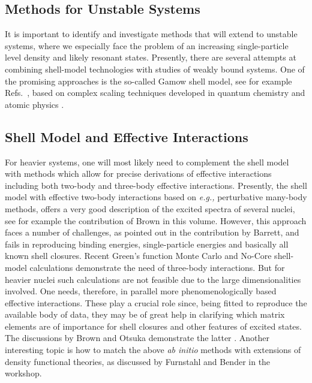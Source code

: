 \documentclass[12pt]{iopart}
\begin{document}
\subsection{Methods for Unstable Systems} 

It is important to identify and investigate 
methods that will extend to unstable 
systems, where we especially face the problem of an increasing single-particle 
level density and likely resonant states.
Presently, there are several attempts at  
combining shell-model 
technologies with  studies of weakly bound systems. 
One of the promising approaches is 
the so-called Gamow shell model, see 
for example Refs.~\cite{witek,roberto}, 
based on complex scaling techniques developed in quantum 
chemistry and atomic physics \cite{nimrod}.


\subsection{Shell Model and Effective Interactions} 

For heavier systems, one will most likely need to 
complement the shell model with methods which allow 
for precise derivations of effective
interactions including both two-body and three-body effective interactions.
Presently, the  shell model with effective two-body interactions based on 
{\it e.g.,} perturbative many-body methods,
offers a very good description of the 
excited spectra of several nuclei, see for example
the contribution of Brown in this volume.
However, this approach faces a number of challenges, as pointed out in the
contribution by Barrett, and fails in reproducing 
binding energies, single-particle energies and basically  
all known shell closures. Recent Green's function Monte Carlo 
and No-Core shell-model 
calculations demonstrate the need of three-body 
interactions.  But for heavier nuclei
such calculations are not feasible due to the 
large dimensionalities involved.
One needs, therefore, in parallel more phenomenologically based 
effective interactions. These play a crucial role
since, being fitted to reproduce the available body of data, 
they may be of great help in clarifying
which matrix elements are of importance for shell 
closures and other features of 
excited states.   The discussions by Brown and Otsuka 
demonstrate the latter \cite{taka}. 
Another interesting topic is how to match the 
above {\it ab initio} methods with extensions
of density functional theories, as discussed by Furnstahl and Bender
in the workshop. 
\end{document}
